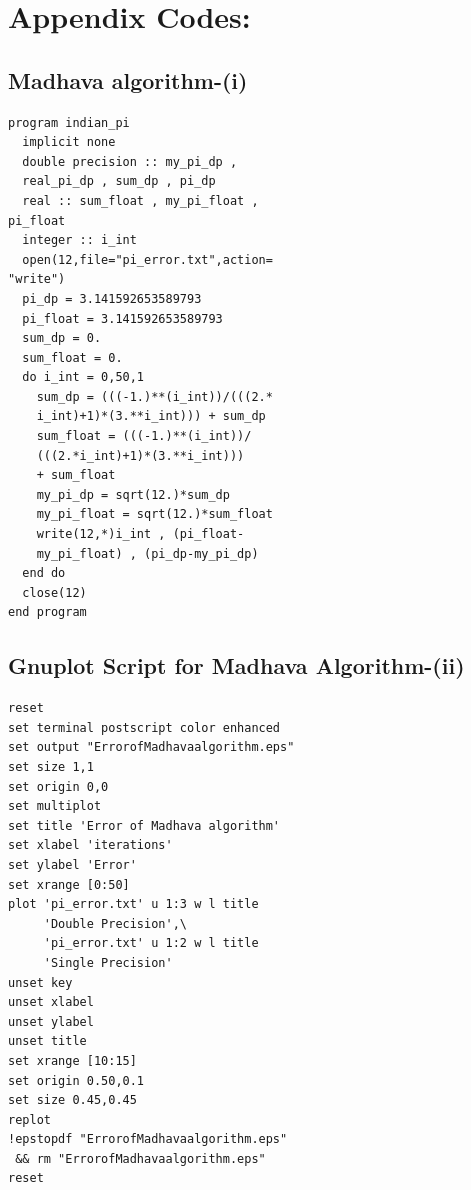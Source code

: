 \documentclass[twocolumn]{article}
\begin{document}
\section{Appendix Codes:}
\subsection{Madhava algorithm-(i)}\label{[Madhava algorithm]}
\begin{verbatim}
program indian_pi
  implicit none
  double precision :: my_pi_dp , 
  real_pi_dp , sum_dp , pi_dp
  real :: sum_float , my_pi_float , 
pi_float
  integer :: i_int
  open(12,file="pi_error.txt",action=
"write")
  pi_dp = 3.141592653589793
  pi_float = 3.141592653589793
  sum_dp = 0.
  sum_float = 0.
  do i_int = 0,50,1
    sum_dp = (((-1.)**(i_int))/(((2.*
    i_int)+1)*(3.**i_int))) + sum_dp
    sum_float = (((-1.)**(i_int))/
    (((2.*i_int)+1)*(3.**i_int))) 
    + sum_float
    my_pi_dp = sqrt(12.)*sum_dp
    my_pi_float = sqrt(12.)*sum_float
    write(12,*)i_int , (pi_float-
    my_pi_float) , (pi_dp-my_pi_dp)
  end do
  close(12)
end program
\end{verbatim}
\subsection{Gnuplot Script for Madhava Algorithm-(ii)} \label{[Madhava gnuplot script]}
\begin{verbatim}
reset
set terminal postscript color enhanced 
set output "ErrorofMadhavaalgorithm.eps"
set size 1,1
set origin 0,0
set multiplot
set title 'Error of Madhava algorithm'
set xlabel 'iterations'
set ylabel 'Error'
set xrange [0:50]
plot 'pi_error.txt' u 1:3 w l title 
	 'Double Precision',\
     'pi_error.txt' u 1:2 w l title
     'Single Precision'
unset key
unset xlabel
unset ylabel
unset title
set xrange [10:15]
set origin 0.50,0.1
set size 0.45,0.45
replot
!epstopdf "ErrorofMadhavaalgorithm.eps"
 && rm "ErrorofMadhavaalgorithm.eps"
reset
\end{verbatim}
\end{document}
